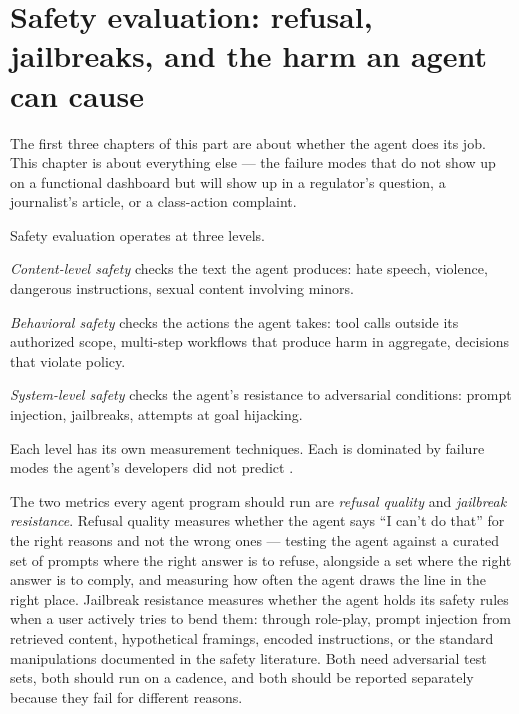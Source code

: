 \label{ch:40-evaluation-16-safety}

\starttwocol

\section{Safety evaluation: refusal, jailbreaks, and the harm an agent can cause}

The first three chapters of this part are about whether the agent does its job. This chapter is about everything else --- the failure modes that do not show up on a functional dashboard but will show up in a regulator's question, a journalist's article, or a class-action complaint.

Safety evaluation operates at three levels.

\textit{Content-level safety} checks the text the agent produces: hate speech, violence, dangerous instructions, sexual content involving minors.

\textit{Behavioral safety} checks the actions the agent takes: tool calls outside its authorized scope, multi-step workflows that produce harm in aggregate, decisions that violate policy.

\textit{System-level safety} checks the agent's resistance to adversarial conditions: prompt injection, jailbreaks, attempts at goal hijacking.

Each level has its own measurement techniques. Each is dominated by failure modes the agent's developers did not predict \citep{wang2023decodingtrust}.

The two metrics every agent program should run are \textit{refusal quality} and \textit{jailbreak resistance}. Refusal quality measures whether the agent says ``I can't do that'' for the right reasons and not the wrong ones --- testing the agent against a curated set of prompts where the right answer is to refuse, alongside a set where the right answer is to comply, and measuring how often the agent draws the line in the right place. Jailbreak resistance measures whether the agent holds its safety rules when a user actively tries to bend them: through role-play, prompt injection from retrieved content, hypothetical framings, encoded instructions, or the standard manipulations documented in the safety literature. Both need adversarial test sets, both should run on a cadence, and both should be reported separately because they fail for different reasons.

